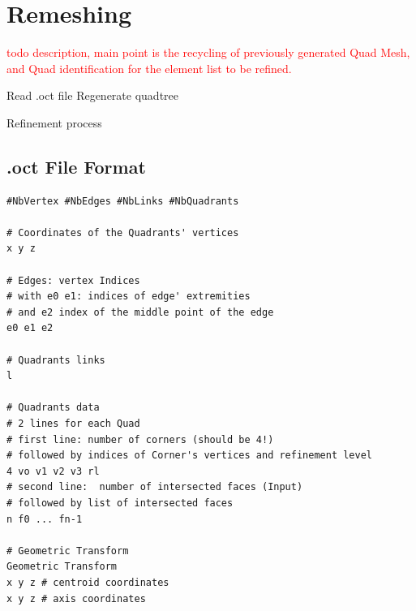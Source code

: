 \documentclass[10pt]{article}
\begin{document}
\section{Remeshing}
\label{sec:remeshing}
\textcolor{red}{todo description, main point is the recycling of previously generated Quad Mesh, and Quad identification for the element list to be refined.}

\begin{algorithm}[H]
\SetAlgoLined
{}
\nl Read .oct file\;
\nl Regenerate quadtree\;
 \caption{Refinement process}
 \label{alg:refinement}
\end{algorithm}

\subsection{.oct File Format}

{\small
\begin{verbatim}
#NbVertex #NbEdges #NbLinks #NbQuadrants

# Coordinates of the Quadrants' vertices
x y z

# Edges: vertex Indices
# with e0 e1: indices of edge' extremities
# and e2 index of the middle point of the edge
e0 e1 e2

# Quadrants links
l

# Quadrants data
# 2 lines for each Quad
# first line: number of corners (should be 4!)
# followed by indices of Corner's vertices and refinement level 
4 vo v1 v2 v3 rl
# second line:  number of intersected faces (Input)
# followed by list of intersected faces
n f0 ... fn-1

# Geometric Transform
Geometric Transform
x y z # centroid coordinates
x y z # axis coordinates

\end{verbatim}
}
\end{document}
